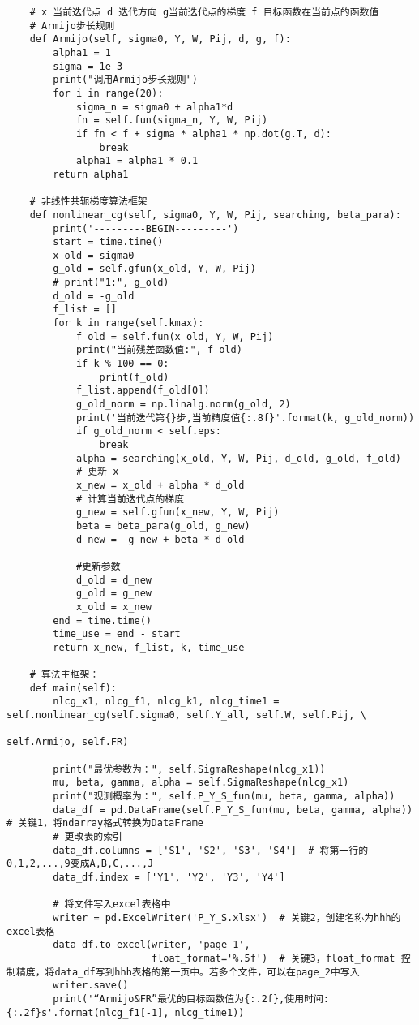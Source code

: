 \begin{lstlisting}
    # x 当前迭代点 d 迭代方向 g当前迭代点的梯度 f 目标函数在当前点的函数值
    # Armijo步长规则
    def Armijo(self, sigma0, Y, W, Pij, d, g, f):
        alpha1 = 1
        sigma = 1e-3
        print("调用Armijo步长规则")
        for i in range(20):
            sigma_n = sigma0 + alpha1*d
            fn = self.fun(sigma_n, Y, W, Pij)
            if fn < f + sigma * alpha1 * np.dot(g.T, d):
                break
            alpha1 = alpha1 * 0.1
        return alpha1

    # 非线性共轭梯度算法框架
    def nonlinear_cg(self, sigma0, Y, W, Pij, searching, beta_para):
        print('---------BEGIN---------')
        start = time.time()
        x_old = sigma0
        g_old = self.gfun(x_old, Y, W, Pij)
        # print("1:", g_old)
        d_old = -g_old
        f_list = []
        for k in range(self.kmax):
            f_old = self.fun(x_old, Y, W, Pij)
            print("当前残差函数值:", f_old)
            if k % 100 == 0:
                print(f_old)
            f_list.append(f_old[0])
            g_old_norm = np.linalg.norm(g_old, 2)
            print('当前迭代第{}步,当前精度值{:.8f}'.format(k, g_old_norm))
            if g_old_norm < self.eps:
                break
            alpha = searching(x_old, Y, W, Pij, d_old, g_old, f_old)
            # 更新 x
            x_new = x_old + alpha * d_old
            # 计算当前迭代点的梯度
            g_new = self.gfun(x_new, Y, W, Pij)
            beta = beta_para(g_old, g_new)
            d_new = -g_new + beta * d_old

            #更新参数
            d_old = d_new
            g_old = g_new
            x_old = x_new
        end = time.time()
        time_use = end - start
        return x_new, f_list, k, time_use

    # 算法主框架：
    def main(self):
        nlcg_x1, nlcg_f1, nlcg_k1, nlcg_time1 = self.nonlinear_cg(self.sigma0, self.Y_all, self.W, self.Pij, \
                                                                  self.Armijo, self.FR)

        print("最优参数为：", self.SigmaReshape(nlcg_x1))
        mu, beta, gamma, alpha = self.SigmaReshape(nlcg_x1)
        print("观测概率为：", self.P_Y_S_fun(mu, beta, gamma, alpha))
        data_df = pd.DataFrame(self.P_Y_S_fun(mu, beta, gamma, alpha))  # 关键1，将ndarray格式转换为DataFrame
        # 更改表的索引
        data_df.columns = ['S1', 'S2', 'S3', 'S4']  # 将第一行的0,1,2,...,9变成A,B,C,...,J
        data_df.index = ['Y1', 'Y2', 'Y3', 'Y4']

        # 将文件写入excel表格中
        writer = pd.ExcelWriter('P_Y_S.xlsx')  # 关键2，创建名称为hhh的excel表格
        data_df.to_excel(writer, 'page_1',
                         float_format='%.5f')  # 关键3，float_format 控制精度，将data_df写到hhh表格的第一页中。若多个文件，可以在page_2中写入
        writer.save()
        print('“Armijo&FR”最优的目标函数值为{:.2f},使用时间: {:.2f}s'.format(nlcg_f1[-1], nlcg_time1))


\end{lstlisting}
